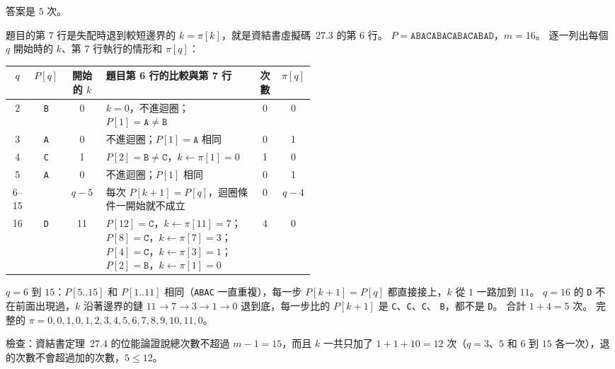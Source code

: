 \begin{pastsoln}
答案是 $5$ 次。

題目的第 7 行是失配時退到較短邊界的 $k = \pi[k]$，就是資結書虛擬碼~27.3 的第 6 行。
$P = \mathtt{ABACABACABACABAD}$，$m = 16$。 逐一列出每個 $q$ 開始時的 $k$、第 7 行執行的情形和
$\pi[q]$：

\begin{center}
\small
\begin{tabular}{ccc>{\raggedright\arraybackslash}p{0.5\linewidth}cc}
\toprule
$q$ & $P[q]$ & 開始的 $k$ & 題目第 6 行的比較與第 7 行 & 次數 & $\pi[q]$ \\
\midrule
2 & \texttt{B} & 0 & $k = 0$，不進迴圈；$P[1] = \mathtt{A} \ne \mathtt{B}$ & 0 & 0 \\
3 & \texttt{A} & 0 & 不進迴圈；$P[1] = \mathtt{A}$ 相同 & 0 & 1 \\
4 & \texttt{C} & 1 & $P[2] = \mathtt{B} \ne \mathtt{C}$，$k \gets \pi[1] = 0$ & 1 & 0 \\
5 & \texttt{A} & 0 & 不進迴圈；$P[1]$ 相同 & 0 & 1 \\
6--15 & & $q - 5$ & 每次 $P[k+1] = P[q]$，迴圈條件一開始就不成立 & 0 & $q - 4$ \\
16 & \texttt{D} & 11 & $P[12] = \mathtt{C}$，$k \gets \pi[11] = 7$；$P[8] = \mathtt{C}$，$k \gets \pi[7] = 3$；
$P[4] = \mathtt{C}$，$k \gets \pi[3] = 1$；$P[2] = \mathtt{B}$，$k \gets \pi[1] = 0$ & 4 & 0 \\
\bottomrule
\end{tabular}
\end{center}

$q = 6$ 到 $15$：$P[5..15]$ 和 $P[1..11]$ 相同（\texttt{ABAC} 一直重複），每一步 $P[k + 1] = P[q]$
都直接接上，$k$ 從 $1$ 一路加到 $11$。 $q = 16$ 的 \texttt{D} 不在前面出現過，$k$ 沿著邊界的鏈
$11 \to 7 \to 3 \to 1 \to 0$ 退到底，每一步比的 $P[k + 1]$ 是 \texttt{C}、\texttt{C}、\texttt{C}、
\texttt{B}，都不是 \texttt{D}。 合計 $1 + 4 = 5$ 次。 完整的
$\pi = 0, 0, 1, 0, 1, 2, 3, 4, 5, 6, 7, 8, 9, 10, 11, 0$。

檢查：資結書定理~27.4 的位能論證說總次數不超過 $m - 1 = 15$，而且 $k$ 一共只加了
$1 + 1 + 10 = 12$ 次（$q = 3$、$5$ 和 $6$ 到 $15$ 各一次），退的次數不會超過加的次數，$5 \le 12$。
\end{pastsoln}
